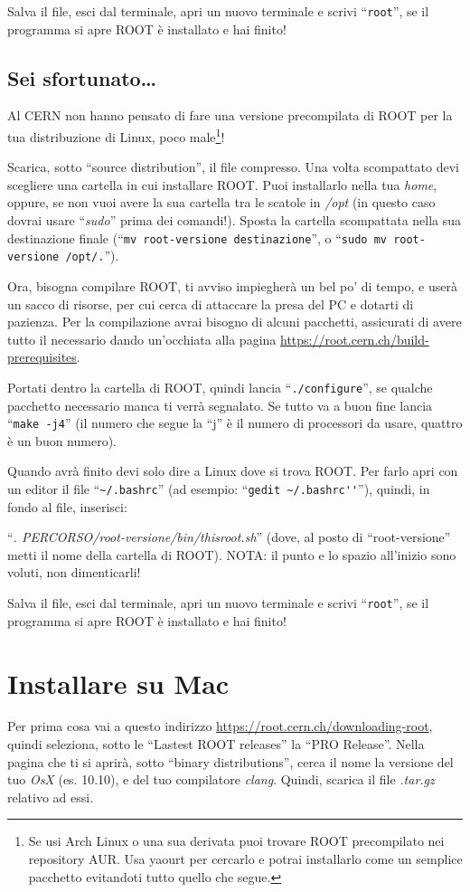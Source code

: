 Salva il file, esci dal terminale, apri un nuovo terminale e scrivi ``\verb|root|'', se il programma si apre ROOT è installato e hai finito!
\subsection{Sei sfortunato\ldots}\label{distronotfound}
Al CERN non hanno pensato di fare una versione precompilata di ROOT per la tua distribuzione di Linux, poco male\footnote{Se usi Arch Linux o una sua derivata puoi trovare ROOT precompilato nei repository AUR. Usa yaourt per cercarlo e potrai installarlo come un semplice pacchetto evitandoti tutto quello che segue.}! 

Scarica, sotto ``source distribution'', il file compresso. Una volta scompattato devi scegliere una cartella in cui installare ROOT. Puoi installarlo nella tua \emph{home}, oppure, se non vuoi avere la sua cartella tra le scatole in \emph{/opt} (in questo caso dovrai usare ``\emph{sudo}'' prima dei comandi!). Sposta la cartella scompattata nella sua destinazione finale (``\verb|mv root-versione destinazione|'', o ``\verb|sudo mv root-versione /opt/.|''). 

Ora, bisogna compilare ROOT, ti avviso impiegherà un bel po' di tempo, e userà un sacco di risorse, per cui cerca di attaccare la presa del PC e dotarti di pazienza. Per la compilazione avrai bisogno di alcuni pacchetti, assicurati di avere tutto il necessario dando un'occhiata alla pagina \url{https://root.cern.ch/build-prerequisites}. 

Portati dentro la cartella di ROOT, quindi lancia ``\verb|./configure|'', se qualche pacchetto necessario manca ti verrà segnalato. Se tutto va a buon fine lancia ``\verb|make -j4|'' (il numero che segue la ``j'' è il numero di processori da usare, quattro è un buon numero).

Quando avrà finito devi solo dire a Linux dove si trova ROOT. Per farlo apri con un editor il file ``\verb|~/.bashrc|'' (ad esempio: ``\verb|gedit ~/.bashrc''|''), quindi, in fondo al file, inserisci:

``\emph{. PERCORSO/root-versione/bin/thisroot.sh}'' (dove, al posto di ``root-versione'' metti il nome della cartella di ROOT). NOTA: il punto e lo spazio all'inizio sono voluti, non dimenticarli!

Salva il file, esci dal terminale, apri un nuovo terminale e scrivi ``\verb|root|'', se il programma si apre ROOT è installato e hai finito!
\section{Installare su Mac}\label{instmac}
Per prima cosa vai a questo indirizzo \url{https://root.cern.ch/downloading-root}, quindi seleziona, sotto le ``Lastest ROOT releases'' la ``PRO Release''. Nella pagina che ti si aprirà, sotto ``binary distributions'', cerca il nome la versione del tuo \emph{OsX} (es. 10.10), e del tuo compilatore \emph{clang}. Quindi, scarica il file \emph{.tar.gz} relativo ad essi. 

